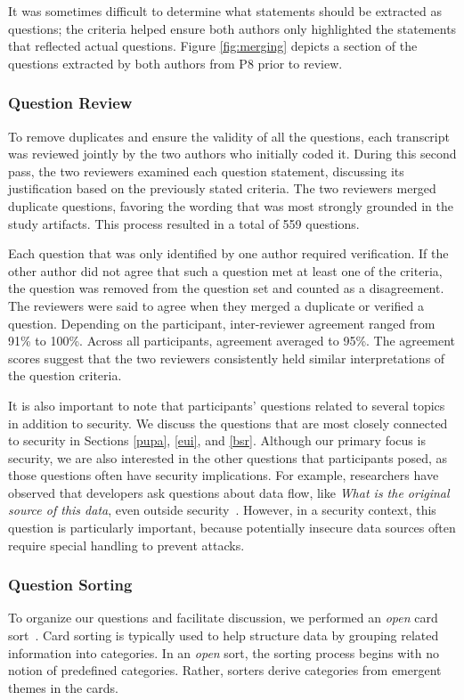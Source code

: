 \documentclass[10pt,journal,compsoc]{IEEEtran}
\begin{document}
It was sometimes difficult to determine what statements should be extracted as questions; the criteria helped ensure both authors only highlighted the statements that reflected actual questions. 
Figure \ref{fig:merging} depicts a section of the questions extracted by both authors from P8 prior to review.


\subsubsection{Question Review}
To remove duplicates and ensure the validity of all the questions, each transcript was reviewed jointly by the two authors who initially coded it.
During this second pass, the two reviewers examined each question statement, discussing its justification based on the previously stated criteria.
The two reviewers merged duplicate questions, favoring the wording that was most strongly grounded in the study artifacts.
This process resulted in a total of 559 questions.

Each question that was only identified by one author required verification.
If the other author did not agree that such a question met at least one of the criteria, the question was removed from the question set and counted as a disagreement.
The reviewers were said to agree when they merged a duplicate or verified a question. Depending on the participant, inter-reviewer agreement ranged from 91\% to 100\%. Across all participants, agreement averaged to 95\%.
The agreement scores suggest that the two reviewers consistently held similar interpretations of the question criteria.

It is also important to note that participants' questions related to several topics in addition to security. 
We discuss the questions that are most closely connected to security in Sections \ref{pupa}, \ref{eui}, and \ref{bsr}.
Although our primary focus is security, we are also interested in the other questions that participants posed, as those questions often have security implications.
For example, researchers have observed that developers ask questions about data flow, like \emph{What is the original source of this data}, even outside security~\cite{latoza2010hard}.
However, in a security context, this question is particularly important, because potentially insecure data sources often require special handling to prevent attacks.


\subsubsection{Question Sorting}
To organize our questions and facilitate discussion, we performed an \textit{open} card sort~\cite{hudson2013sorting}. 
Card sorting is typically used to help structure data by grouping related information into categories. 
In an \textit{open} sort, the sorting process begins with no notion of predefined categories. 
Rather, sorters derive categories from emergent themes in the cards. 
\end{document}

